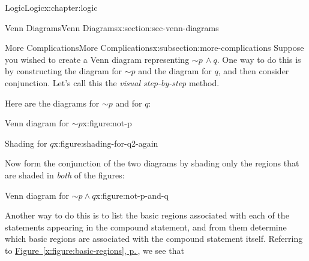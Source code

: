 \documentclass[twoside,10pt,]{book}
\newcommand{\xreffont}{\relax}
\numberwithin{equation}{section}
\begin{document}
\begin{chapterptx}{Logic}{}{Logic}{}{}{x:chapter:logic}
\begin{sectionptx}{Venn Diagrams}{}{Venn Diagrams}{}{}{x:section:sec-venn-diagrams}
\begin{subsectionptx}{More Complications}{}{More Complications}{}{}{x:subsection:more-complications}
Suppose you wished to create a Venn diagram representing \(\sim\!{p}\,{\wedge} q\).  One way to do this is by constructing the diagram for \(\sim\!{p}\) and the diagram for \(q\), and then consider conjunction.  Let's call this the \emph{visual step-by-step} method.%
\par
Here are the diagrams for \(\sim\!{p}\) and for \(q\): \begin{sidebyside}{2}{0.05}{0.05}{0.1}%
\begin{sbspanel}{0.4}%
\begin{figureptx}{Venn diagram for \(\sim\!{p}\)}{x:figure:not-p}{}%
\resizebox{\linewidth}{!}{%
\begin{venndiagram2sets}[labelA={$p$},labelB={$q$}]
  \fillNotA
\end{venndiagram2sets}
}%
\tcblower
\end{figureptx}%
\end{sbspanel}%
\begin{sbspanel}{0.4}%
\begin{figureptx}{Shading for \(q\)}{x:figure:shading-for-q2-again}{}%
\resizebox{\linewidth}{!}{%
\begin{venndiagram2sets}[labelA={$p$},labelB={$q$}]
  \fillB
\end{venndiagram2sets}
}%
\tcblower
\end{figureptx}%
\end{sbspanel}%
\end{sidebyside}%
%
\par
Now form the conjunction of the two diagrams by shading only the regions that are shaded in \emph{both} of the figures:%
\par
\begin{figureptx}{Venn diagram for \(\sim\!{p}{\wedge} q\)}{x:figure:not-p-and-q}{}%
\begin{image}{0.3}{0.4}{0.3}%
\resizebox{\linewidth}{!}{%
\begin{venndiagram2sets}[labelA={$p$},labelB={$q$}]
  \fillOnlyB
\end{venndiagram2sets}
}%
\end{image}%
\tcblower
\end{figureptx}%
%
\par
Another way to do this is to list the basic regions associated with each of the statements appearing in the compound statement, and from them determine which basic regions are associated with the compound statement itself.  Referring to \hyperref[x:figure:basic-regions]{Figure~{\xreffont\ref{x:figure:basic-regions}}, p.\,\pageref{x:figure:basic-regions}}, we see that%

\end{subsectionptx}
\end{sectionptx}
\end{chapterptx}
\end{document}
